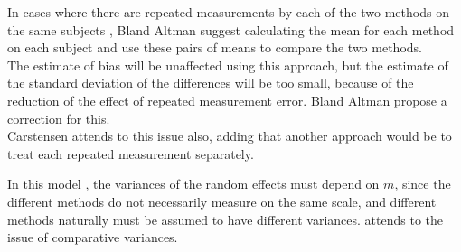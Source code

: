 In cases where there are repeated measurements by each of the two methods on the same subjects , Bland Altman suggest calculating the mean for each method on each subject and use these pairs of means to compare the two methods.
\\
The estimate of bias will be unaffected using this approach, but the estimate of the standard deviation of the differences will be
too small, because of the reduction of the effect of repeated measurement error. Bland Altman propose a correction for this.
\\
Carstensen attends to this issue also, adding that another approach would be to treat each repeated measurement separately.


In this model , the variances of the random effects must depend on
$m$, since the different methods do not necessarily measure on the
same scale, and different methods naturally must be assumed to
have different variances. \citet{BXC2004} attends to the issue of
comparative variances.



\newpage
